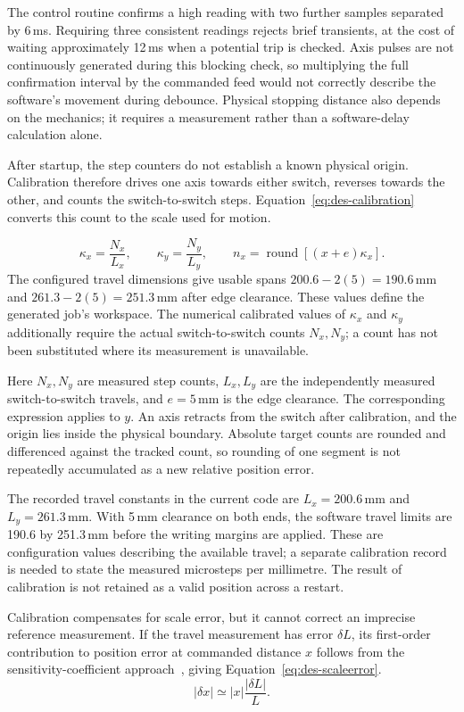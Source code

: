 The control routine confirms a high reading with two further samples separated by 6\,ms. Requiring three consistent readings rejects brief transients, at the cost of waiting approximately 12\,ms when a potential trip is checked. Axis pulses are not continuously generated during this blocking check, so multiplying the full confirmation interval by the commanded feed would not correctly describe the software's movement during debounce. Physical stopping distance also depends on the mechanics; it requires a measurement rather than a software-delay calculation alone.

After startup, the step counters do not establish a known physical origin. Calibration therefore drives one axis towards either switch, reverses towards the other, and counts the switch-to-switch steps. Equation~\ref{eq:des-calibration} converts this count to the scale used for motion.

\begin{equation}
\kappa_x=\frac{N_x}{L_x},\qquad \kappa_y=\frac{N_y}{L_y},\qquad
n_x=\operatorname{round}[(x+e)\kappa_x].
\label{eq:des-calibration}
\end{equation}
The configured travel dimensions give usable spans $200.6-2(5)=190.6$\,mm and $261.3-2(5)=251.3$\,mm after edge clearance. These values define the generated job's workspace. The numerical calibrated values of $\kappa_x$ and $\kappa_y$ additionally require the actual switch-to-switch counts $N_x,N_y$; a count has not been substituted where its measurement is unavailable.

Here $N_x,N_y$ are measured step counts, $L_x,L_y$ are the independently measured switch-to-switch travels, and $e=5$\,mm is the edge clearance. The corresponding expression applies to $y$. An axis retracts from the switch after calibration, and the origin lies inside the physical boundary. Absolute target counts are rounded and differenced against the tracked count, so rounding of one segment is not repeatedly accumulated as a new relative position error.

The recorded travel constants in the current code are $L_x=200.6$\,mm and $L_y=261.3$\,mm. With 5\,mm clearance on both ends, the software travel limits are 190.6 by 251.3\,mm before the writing margins are applied. These are configuration values describing the available travel; a separate calibration record is needed to state the measured microsteps per millimetre. The result of calibration is not retained as a valid position across a restart.

Calibration compensates for scale error, but it cannot correct an imprecise reference measurement. If the travel measurement has error $\delta L$, its first-order contribution to position error at commanded distance $x$ follows from the sensitivity-coefficient approach~\cite[pp.~18--19]{jcgm2008}, giving Equation~\ref{eq:des-scaleerror}.
\begin{equation}
|\delta x|\simeq |x|\frac{|\delta L|}{L}.
\label{eq:des-scaleerror}
\end{equation}


